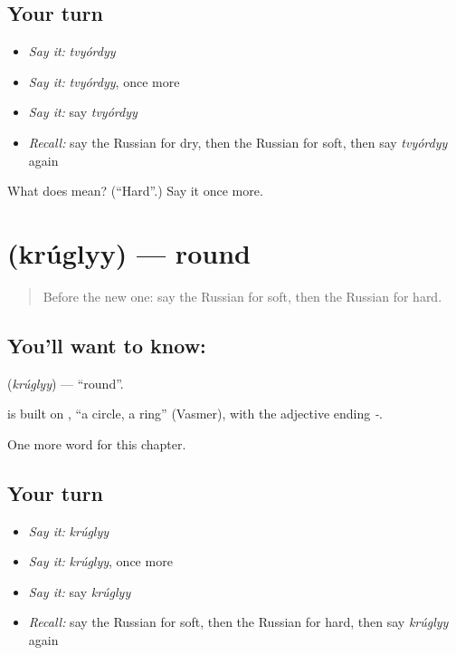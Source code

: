 \subsection*{Your turn}
\begin{itemize}
\raggedright
  \item \emph{Say it:} \emph{tvyórdyy}
  \item \emph{Say it:} \emph{tvyórdyy}, once more
  \item \emph{Say it:} say \emph{tvyórdyy}
  \item \emph{Recall:} say the Russian for dry, then the Russian for soft, then say \emph{tvyórdyy} again
\end{itemize}

\begin{tcolorbox}[breakable,colback=teal!4,colframe=teal!35!black,title={Before you move on}]
What does  mean? (\textquotedblleft{}Hard\textquotedblright{}.) Say it once more.
\end{tcolorbox}
\section[\texorpdfstring{\ru{круглый} (krúglyy)}{круглый (krúglyy)}]{ (krúglyy) — round}

\label{lesson:RU-C129-round}



\begin{quote}
Before the new one: say the Russian for soft, then the Russian for hard.
\end{quote}

\subsection*{You'll want to know: }
\textbf{} (\emph{krúglyy}) — \textquotedblleft{}round\textquotedblright{}.

\begin{cousinweb}
\textbf{} is built on \emph{}, \textquotedblleft{}a circle, a ring\textquotedblright{} (Vasmer), with the adjective ending \emph{-}.
\end{cousinweb}

\begin{grammarlens}[title={What you've built}]
One more word for this chapter.
\end{grammarlens}

\subsection*{Your turn}
\begin{itemize}
\raggedright
  \item \emph{Say it:} \emph{krúglyy}
  \item \emph{Say it:} \emph{krúglyy}, once more
  \item \emph{Say it:} say \emph{krúglyy}
  \item \emph{Recall:} say the Russian for soft, then the Russian for hard, then say \emph{krúglyy} again
\end{itemize}

